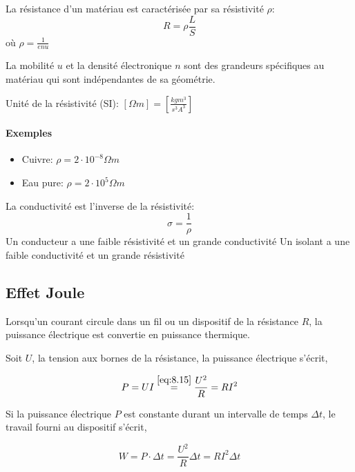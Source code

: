 \documentclass[
    11pt,
    a4paper,
    oneside,
    headinlcude, footinclude,
    twoside,
]{report}
\begin{document}
La résistance d'un matériau est caractérisée par sa résistivité $\rho$:
\begin{equation}
    \label{eq:8.16}
    R = \rho \frac{L}{S}
\end{equation}
où $\rho = \frac{1}{enu}$

La mobilité $u$ et la densité électronique $n$ sont des grandeurs spécifiques
au matériau qui sont indépendantes de sa géométrie.

Unité de la résistivité (SI): $[\Omega m] = \left[\frac{kgm^3}{s^3A^3}\right]$

\paragraph{Exemples}

\begin{itemize}
    \item Cuivre: $\rho = 2 \cdot 10^{-8} \Omega m$
    \item Eau pure: $\rho = 2 \cdot 10^{5} \Omega m$
\end{itemize}

La conductivité est l'inverse de la résistivité:
\begin{equation}
    \label{eq:8.17}
    \sigma = \frac{1}{\rho}     
\end{equation}
Un conducteur a une faible résistivité et un grande conductivité
Un isolant a une faible conductivité et un grande résistivité

\subsection{Effet Joule}
\label{sub:effet_joule}

Lorsqu'un courant circule dans un fil ou un dispositif de la résistance $R$, la
puissance électrique est convertie en puissance thermique.

Soit $U$, la tension aux bornes de la résistance, la puissance électrique
s'écrit,

\begin{equation}
    \label{eq:8.18}
    P = UI \stackrel{\eqref{eq:8.15}}{=} \frac{U^2}{R} = RI^2
\end{equation}

Si la puissance électrique $P$ est constante durant un intervalle de temps $\Delta
t$, le travail fourni au dispositif s'écrit,

\begin{equation}
    \label{eq:8.19} 
    W = P \cdot \Delta t = \frac{U^2}{R} \Delta t = R I^2 \Delta t
\end{equation}
\end{document}
